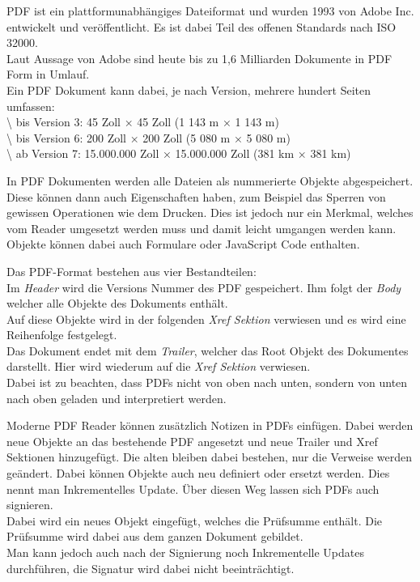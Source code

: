\documentclass[
]{article}
\begin{document}
PDF ist ein plattformunabhängiges Dateiformat und wurden 1993 von Adobe
Inc. entwickelt und veröffentlicht. Es ist dabei Teil des offenen
Standards nach ISO 32000.\\
Laut Aussage von Adobe sind heute bis zu 1,6 Milliarden Dokumente in PDF
Form in Umlauf.\\
Ein PDF Dokument kann dabei, je nach Version, mehrere hundert Seiten
umfassen:\\
\textbackslash{} bis Version 3: 45 Zoll × 45 Zoll (1 143 m × 1 143 m)\\
\textbackslash{} bis Version 6: 200 Zoll × 200 Zoll (5 080 m × 5 080
m)\\
\textbackslash{} ab Version 7: 15.000.000 Zoll × 15.000.000 Zoll (381 km
× 381 km)

In PDF Dokumenten werden alle Dateien als nummerierte Objekte
abgespeichert. Diese können dann auch Eigenschaften haben, zum Beispiel
das Sperren von gewissen Operationen wie dem Drucken. Dies ist jedoch
nur ein Merkmal, welches vom Reader umgesetzt werden muss und damit
leicht umgangen werden kann.\\
Objekte können dabei auch Formulare oder JavaScript Code enthalten.

Das PDF-Format bestehen aus vier Bestandteilen:\\
Im \emph{Header} wird die Versions Nummer des PDF gespeichert. Ihm folgt
der \emph{Body} welcher alle Objekte des Dokuments enthält.\\
Auf diese Objekte wird in der folgenden \emph{Xref Sektion} verwiesen
und es wird eine Reihenfolge festgelegt. \\
Das Dokument endet mit dem \emph{Trailer}, welcher das Root Objekt des
Dokumentes darstellt. Hier wird wiederum auf die \emph{Xref Sektion}
verwiesen.\\
Dabei ist zu beachten, dass PDFs nicht von oben nach unten, sondern von
unten nach oben geladen und interpretiert werden.

Moderne PDF Reader können zusätzlich Notizen in PDFs einfügen. Dabei
werden neue Objekte an das bestehende PDF angesetzt und neue Trailer und
Xref Sektionen hinzugefügt. Die alten bleiben dabei bestehen, nur die
Verweise werden geändert. Dabei können Objekte auch neu definiert oder
ersetzt werden. Dies nennt man Inkrementelles Update. Über diesen Weg
lassen sich PDFs auch signieren. \\
Dabei wird ein neues Objekt eingefügt, welches die Prüfsumme enthält.
Die Prüfsumme wird dabei aus dem ganzen Dokument gebildet.\\
Man kann jedoch auch nach der Signierung noch Inkrementelle Updates
durchführen, die Signatur wird dabei nicht beeinträchtigt.
\end{document}
